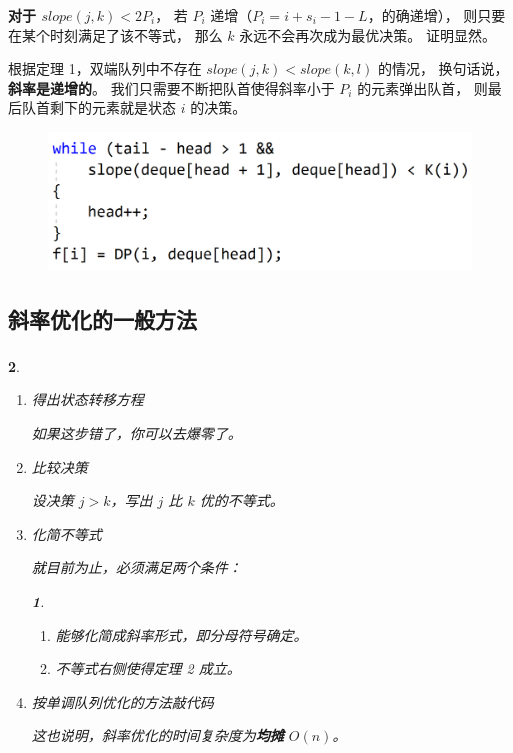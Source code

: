 \documentclass[9pt, UTF8]{beamer} %
\newcommand \fts {\frametitle{\insertsubsection}}
\newtheorem*{bbox}{}
\begin{document}
	\begin{frame}
		\fts

		\begin{theorem}
			\textbf{对于 $slope(j, k) < 2 P_i$}，
			若 $P_i$ 递增（$P_i = i + s_i - 1 - L$，的确递增），
			则只要在某个时刻满足了该不等式，
			那么 $k$ 永远不会再次成为最优决策。
			证明显然。
		\end{theorem}

		根据定理 1，双端队列中不存在 $slope(j, k) < slope(k, l)$ 的情况，
		换句话说，\textbf{斜率是递增的}。
		我们只需要不断把队首使得斜率小于 $P_i$ 的元素弹出队首，
		则最后队首剩下的元素就是状态 $i$ 的决策。

		\begin{figure}
			\centering
			\includegraphics[scale=0.175]{pic/pic3.png}
		\end{figure}
	\end{frame}

	\subsection{斜率优化的一般方法}

	\begin{frame}
		\fts

		\begin{bbox}
			\begin{enumerate}
				\item 得出状态转移方程

				如果这步错了，你可以去爆零了。

				\item 比较决策

				设决策 $j > k$，写出 $j$ 比 $k$ 优的不等式。

				\item 化简不等式

				就目前为止，必须满足两个条件：
				\begin{bbox}
					\begin{enumerate}
						\item 能够化简成斜率形式，即分母符号确定。

						\item 不等式右侧使得定理 2 成立。
					\end{enumerate}
				\end{bbox}

				\item 按单调队列优化的方法敲代码

				这也说明，斜率优化的时间复杂度为\textbf{均摊} $O(n)$。
			\end{enumerate}
		\end{bbox}
	\end{frame}
\end{document}
